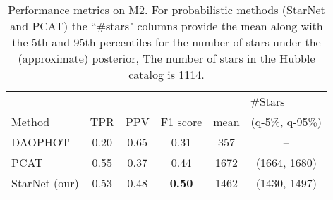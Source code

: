 
\begin{table}[!tb]
\centering
\caption{Performance metrics on M2.
For probabilistic methods (StarNet and PCAT)
the ``\#stars" columns provide the mean along with the 5th and 95th percentiles
for the number of stars under the (approximate) posterior,
The number of stars in the Hubble catalog is 1114. }
\label{tab:summary_stats}
\begin{tabular}{l|ccc|cc}
\toprule
& & & & \multicolumn{2}{c}{\#Stars} \\
     Method &   TPR &   PPV &  F1 score &  mean & (q-5\%, q-95\%)\\
\midrule
    DAOPHOT &  0.20 &  0.65 &      0.31 &     357 & -- \\
       PCAT &  0.55 &  0.37 &      0.44 &    1672 & (1664, 1680)\\
 StarNet (our) &  0.53 &  0.48 &      \textbf{0.50} &    1462 & (1430, 1497)\\
\bottomrule
\end{tabular}
\end{table}

